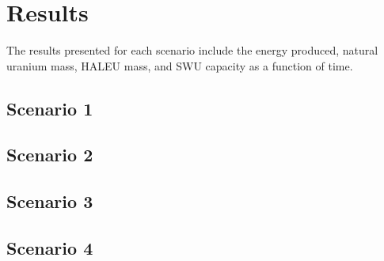 \section{Results}
The results presented for each scenario include the energy produced, natural
uranium mass, \gls{HALEU} mass, and \gls{SWU} capacity as a function of time. 

\subsection{Scenario 1}

\subsection{Scenario 2}

\subsection{Scenario 3}

\subsection{Scenario 4}
